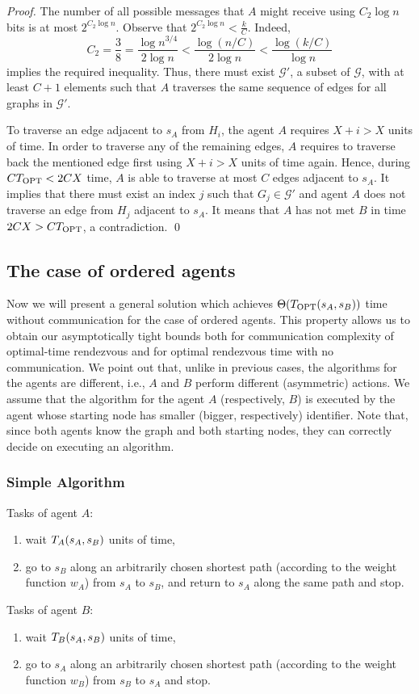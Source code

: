 \documentclass{llncs}
\newcommand{\simplealgorithm}{Simple Algorithm}
\newcommand{\Topt}[2]{T_{{\scriptsize \textup{OPT}}}(#1,#2)}
\newcommand{\Topts}{T_{\scriptsize \textup{OPT}}}
\newcommand{\dist}[4][]{\if!#1!T_{#2}(#3,#4)\else T_{#2}(#3,#4,#1)\fi}
\newcommand{\startpos}[1]{s_{#1}}
\newcommand{\starta}{\startpos{A}}
\newcommand{\startb}{\startpos{B}}
\newcommand{\cG}{\mathcal{G}}
\begin{document}
\begin{proof}
The number of all possible messages that $A$ might receive using $C_2 \log n$ bits is at most $2^{C_2 \log n}$.
Observe that $2^{C_2 \log n} < \frac{k}{C}$. Indeed, 
\[
  C_2 = \frac{3}{8} = \frac{\log n^{3/4}}{2 \log n} < \frac{\log (n/C)}{2 \log n} < \frac{\log (k/C)}{\log n}  
\] 
implies the required inequality.
Thus, there must exist $\cG'$, a subset of $\cG$, with at least $C+1$ elements such that $A$ traverses the same sequence of edges for all graphs in $\cG'$. 

To traverse an edge adjacent to $\starta$ from $H_i$, the agent $A$ requires $X+i > X$ units of time.
In order to traverse any of the remaining edges, $A$ requires to traverse back the mentioned edge first using $X+i > X$ units of time again.
Hence, during $C\Topts < 2CX$ time, $A$ is able to traverse at most $C$ edges adjacent to $\starta$. 
It implies that there must exist an index $j$ such that $G_j \in \cG'$ and agent $A$ does not traverse an edge from $H_j$ adjacent to $\starta$. 
It means that $A$ has not met $B$ in time $2CX  > C\Topts$, a contradiction.   
\qed\end{proof}


\subsection{The case of ordered agents}
Now we will present a general solution which achieves $\Theta(\Topt{\starta}{\startb})$ time without communication for the case of ordered agents.
This property allows us to obtain our asymptotically tight bounds both for communication complexity of optimal-time rendezvous and for optimal rendezvous time with no communication.
We point out that, unlike in previous cases, the algorithms for the agents are different, i.e., $A$ and $B$ perform different (asymmetric) actions.
We assume that the algorithm for the agent $A$ (respectively, $B$) is executed by the agent whose starting node has smaller (bigger, respectively) identifier.
Note that, since both agents know the graph and both starting nodes, they can correctly decide on executing an algorithm.

\subsubsection*{\simplealgorithm}

Tasks of agent $A$:
\begin{enumerate}
  \item wait $\dist{A}{\starta}{\startb}$ units of time,
  \item  go to $\startb$ along an arbitrarily chosen shortest path (according to the weight function $w_A$) from $\starta$ to $\startb$, and return to $\starta$ along the same path and stop.
\end{enumerate}
\noindent
Tasks of agent $B$:
\begin{enumerate}
 \item  wait $\dist{B}{\starta}{\startb}$ units of time,
 \item go to $\starta$ along an arbitrarily chosen shortest path (according to the weight function $w_B$) from $\startb$ to $\starta$ and stop.
\end{enumerate}
\end{document}
